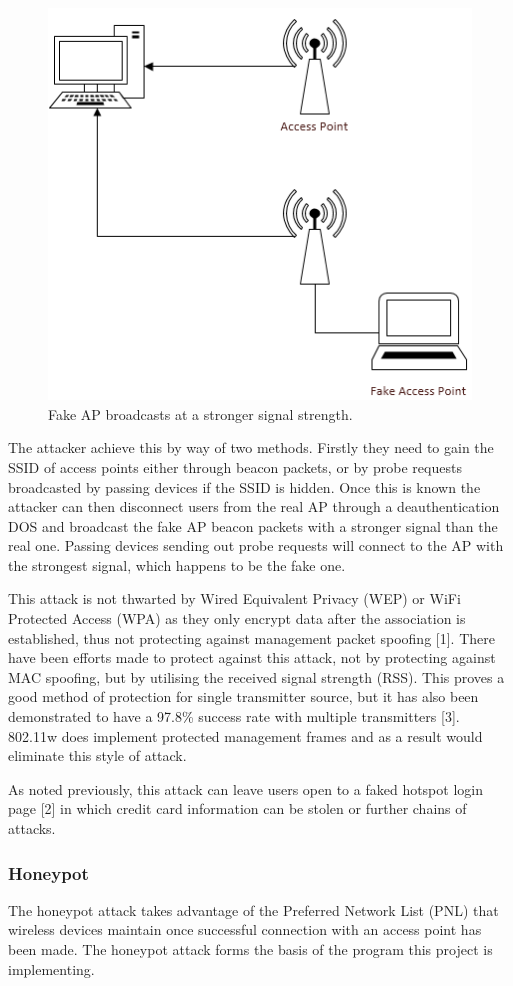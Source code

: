 \begin{figure}[h!]
\includegraphics[width=\linewidth]{research/figures/eviltwin.png}
\caption{Fake AP broadcasts at a stronger signal strength.}
\end{figure}

The attacker achieve this by way of two methods. Firstly they need to gain the SSID of access points either through beacon packets, or by probe requests broadcasted by passing devices if the SSID is hidden. Once this is known the attacker can then disconnect users from the real AP through a deauthentication DOS and broadcast the fake AP beacon packets with a stronger signal than the real one. Passing devices sending out probe requests will connect to the AP with the strongest signal, which happens to be the fake one.  

This attack is not thwarted by Wired Equivalent Privacy (WEP) or WiFi Protected Access (WPA) as they only encrypt data after the association is established, thus not protecting against management packet spoofing [1]. There have been efforts made to protect against this attack, not by protecting against MAC spoofing, but by utilising the received signal strength (RSS). This proves a good method of protection for single transmitter source, but it has also been demonstrated to have a 97.8\% success rate with multiple transmitters [3]. 802.11w does implement protected management frames and as a result would eliminate this style of attack.

As noted previously, this attack can leave users open to a faked hotspot login page [2] in which credit card information can be stolen or further chains of attacks.

\subsubsection{Honeypot}
The honeypot attack takes advantage of the Preferred Network List (PNL) that wireless devices maintain once successful connection with an access point has been made. The honeypot attack forms the basis of the program this project is implementing.
